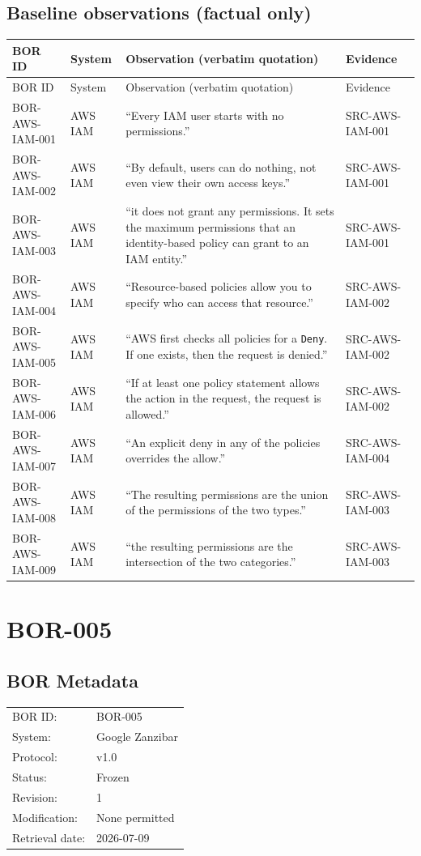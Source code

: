 \documentclass{article}
\begin{document}
\subsection*{Baseline observations (factual only)}
\begin{longtable}{@{}p{}p{}p{}p{}@{}}
\toprule
BOR ID & System & Observation (verbatim quotation) & Evidence\\
\midrule
\endfirsthead
\toprule
BOR ID & System & Observation (verbatim quotation) & Evidence\\
\midrule
\endhead
BOR-AWS-IAM-001 & AWS IAM & ``Every IAM user starts with no permissions.'' & SRC-AWS-IAM-001\\
BOR-AWS-IAM-002 & AWS IAM & ``By default, users can do nothing, not even view their own access keys.'' & SRC-AWS-IAM-001\\
BOR-AWS-IAM-003 & AWS IAM & ``it does not grant any permissions. It sets the maximum permissions that an identity-based policy can grant to an IAM entity.'' & SRC-AWS-IAM-001\\
BOR-AWS-IAM-004 & AWS IAM & ``Resource-based policies allow you to specify who can access that resource.'' & SRC-AWS-IAM-002\\
BOR-AWS-IAM-005 & AWS IAM & ``AWS first checks all policies for a \texttt{Deny}. If one exists, then the request is denied.'' & SRC-AWS-IAM-002\\
BOR-AWS-IAM-006 & AWS IAM & ``If at least one policy statement allows the action in the request, the request is allowed.'' & SRC-AWS-IAM-002\\
BOR-AWS-IAM-007 & AWS IAM & ``An explicit deny in any of the policies overrides the allow.'' & SRC-AWS-IAM-004\\
BOR-AWS-IAM-008 & AWS IAM & ``The resulting permissions are the union of the permissions of the two types.'' & SRC-AWS-IAM-003\\
BOR-AWS-IAM-009 & AWS IAM & ``the resulting permissions are the intersection of the two categories.'' & SRC-AWS-IAM-003\\
\bottomrule
\end{longtable}
\newpage
\section*{BOR-005}

\subsection*{BOR Metadata}
\begin{tabular}{@{}ll@{}}
\toprule
BOR ID: & BOR-005\\
System: & Google Zanzibar\\
Protocol: & v1.0\\
Status: & Frozen\\
Revision: & 1\\
Modification: & None permitted\\
Retrieval date: & 2026-07-09\\
\bottomrule
\end{tabular}
\end{document}
